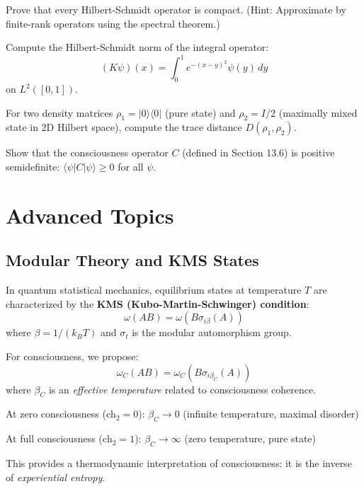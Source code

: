 \begin{exercise}
Prove that every Hilbert-Schmidt operator is compact. (Hint: Approximate by finite-rank operators using the spectral theorem.)
\end{exercise}

\begin{exercise}
Compute the Hilbert-Schmidt norm of the integral operator:
\begin{equation}
(K\psi)(x) = \int_0^1 e^{-(x-y)^2} \psi(y) \, dy
\end{equation}
on $L^2([0,1])$.
\end{exercise}

\begin{exercise}
For two density matrices $\rho_1 = |0\rangle\langle 0|$ (pure state) and $\rho_2 = I/2$ (maximally mixed state in 2D Hilbert space), compute the trace distance $D(\rho_1, \rho_2)$.
\end{exercise}

\begin{exercise}
Show that the consciousness operator $C$ (defined in Section 13.6) is positive semidefinite: $\langle \psi | C | \psi \rangle \geq 0$ for all $\psi$.
\end{exercise}

\section{Advanced Topics}

\begin{advanced}
\subsection{Modular Theory and KMS States}

In quantum statistical mechanics, equilibrium states at temperature $T$ are characterized by the \textbf{KMS (Kubo-Martin-Schwinger) condition}:
\begin{equation}
\omega(AB) = \omega(B \sigma_{i\beta}(A))
\end{equation}
where $\beta = 1/(k_B T)$ and $\sigma_t$ is the modular automorphism group.

For consciousness, we propose:
\begin{equation}
\omega_C(AB) = \omega_C(B \sigma_{i\beta_C}(A))
\end{equation}
where $\beta_C$ is an \textit{effective temperature} related to consciousness coherence.

At zero consciousness ($\text{ch}_2 = 0$): $\beta_C \to 0$ (infinite temperature, maximal disorder)

At full consciousness ($\text{ch}_2 = 1$): $\beta_C \to \infty$ (zero temperature, pure state)

This provides a thermodynamic interpretation of consciousness: it is the inverse of \textit{experiential entropy}.
\end{advanced}

